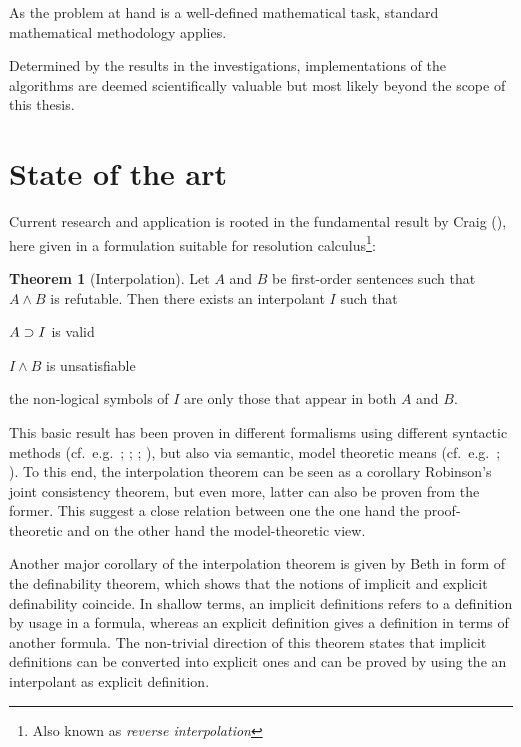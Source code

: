 \documentclass[,%
			paper=a4,%
			DIV11, %
			liststotoc,
			bibtotoc,
			draft=false,%
			numbers=noendperiod
			]{scrartcl}
\theoremstyle{definition}
\newtheorem{thm}{Theorem}
\begin{document}
As the problem at hand is a well-defined mathematical task, standard mathematical methodology applies.

Determined by the results in the investigations, implementations of the algorithms are deemed scientifically valuable but most likely beyond the scope of this thesis.


\section{State of the art}

Current research and application is rooted in the fundamental result by Craig (\cite{craig57linear}), here given in a formulation suitable for resolution calculus\footnote{Also known as \emph{reverse interpolation}}:

\begin{samepage}
\begin{thm}[Interpolation]
	Let $A$ and $B$ be first-order sentences such that $A \land B$ is refutable. 
	Then there exists an interpolant $I$ such that \nopagebreak[4]
	\begin{compactenum}
		\item $ A \supset I$ is valid 
		\item $I \land B$ is unsatisfiable
		\item the non-logical symbols of $I$ are only those that appear in both $A$ and $B$.
	\end{compactenum}
\end{thm}
\end{samepage}

This basic result has been proven in different formalisms using different syntactic methods (cf.~e.g.~\cite{craig57linear}; \cite{takeuti1987proof}; \cite{krajivcek1997interpolation}; \cite{Pudlak97}), but also via semantic, model theoretic means (cf.~e.g.~\cite[section 5.2]{shoenfield1967mathematical}; \cite[theorem~2.2.20]{chang1990model}).
To this end, the interpolation theorem can be seen as a corollary Robinson's joint consistency theorem, but even more, latter can also be proven from the former. 
This suggest a close relation between one the one hand the proof-theoretic and on the other hand the model-theoretic view.

Another major corollary of the interpolation theorem is given by Beth in form of the definability theorem, which shows that the notions of implicit and explicit definability coincide.
In shallow terms, an implicit definitions refers to a definition by usage in a formula, whereas an explicit definition gives a definition in terms of another formula.
The non-trivial direction of this theorem states that implicit definitions can be converted into explicit ones and can be proved by using the an interpolant as explicit definition.
\end{document}
